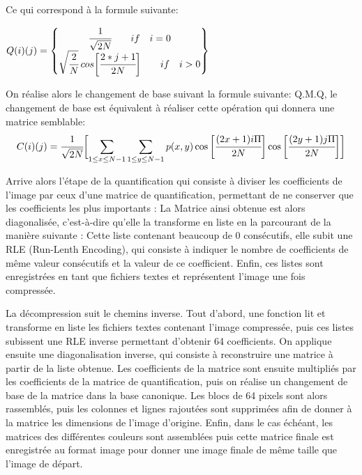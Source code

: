 \documentclass[12pt]{article}
\begin{document}
\paragraph{}

Ce qui correspond à la formule suivante:
\begin{center}
$Q(i)(j)=
\begin{Bmatrix}
\cfrac{1}{\sqrt{2N}}  \qquad if \quad i=0 \\
\sqrt{\cfrac{2}{N}} \: cos\biggl[\cfrac{2*j+1}{2N}\biggr] \qquad if \quad i>0 \\
\end{Bmatrix}
$
\end{center}
On réalise alors le changement de base suivant la formule suivante: Q.M.Q, le changement de base est équivalent à réaliser cette opération qui donnera une matrice semblable:
\begin{equation*} 
C(i)(j)=\cfrac{1}{\sqrt{2N}} \biggl[\sum_{1\leq x\leq N-1} \sum_{1\leq y\leq N-1} p(x,y) \cos{\biggl[\cfrac{(2x+1) i \Pi}{2N}}\biggr] \cos{\biggl[\cfrac{(2y+1) j \Pi}{2N}}\biggr]\biggr]
\end{equation*}


 Arrive alors l’étape de la quantification qui consiste à diviser les coefficients de l’image par ceux d’une matrice de quantification, permettant de ne conserver que les coefficients les plus importants : 
La Matrice ainsi obtenue est alors diagonalisée, c’est-à-dire qu’elle la transforme en liste en la parcourant de la manière suivante :
Cette liste contenant beaucoup de 0 consécutifs, elle subit une RLE (Run-Lenth Encoding), qui consiste à indiquer le nombre de coefficients de même valeur consécutifs et la valeur de ce coefficient. Enfin, ces listes sont enregistrées en tant que fichiers textes et représentent l’image une fois compressée.

La décompression suit le chemins inverse. Tout d’abord, une fonction lit et transforme en liste les fichiers textes contenant l’image compressée, puis ces listes subissent une RLE inverse permettant d’obtenir 64 coefficients. On applique ensuite une diagonalisation inverse, qui consiste à reconstruire une matrice à partir de la liste obtenue. Les coefficients de la matrice sont ensuite multipliés par les coefficients de la matrice de quantification, puis on réalise un changement de base de la matrice dans la base canonique. Les blocs de 64 pixels sont alors rassemblés, puis les colonnes et lignes rajoutées sont supprimées afin de donner à la matrice les dimensions de l’image d’origine. Enfin, dans le cas échéant, les matrices des différentes couleurs sont assemblées puis cette matrice finale est enregistrée au format image pour donner une image finale de même taille que l’image de départ.
\end{document}
